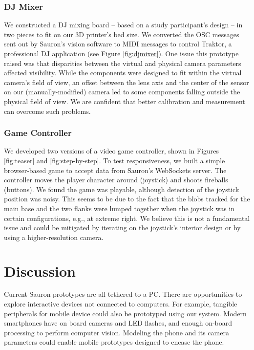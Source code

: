 \subsubsection{DJ Mixer}
We constructed a DJ mixing board -- based on a study participant's design -- in two pieces to fit on our 3D printer's bed size.  We converted the OSC messages sent out by Sauron's vision software to MIDI messages to control Traktor, a professional DJ application (see Figure \ref{fig:djmixer}).  One issue this prototype raised was that disparities between the virtual and physical camera parameters affected visibility. While the components were designed to fit within the virtual camera's field of view, an offset between the lens axis and the center of the sensor on our (manually-modified) camera led to some components falling outside the physical field of view. We are confident that better calibration and measurement can overcome such problems.

\subsubsection{Game Controller}
We developed two versions of a video game controller, shown in Figures \ref{fig:teaser} and \ref{fig:step-by-step}.  To test responsiveness, we built a simple browser-based game to accept data from Sauron's WebSockets server.  The controller moves the player character around (joystick) and shoots fireballs (buttons).  We found the game was playable, although detection of the joystick position was noisy.  This seems to be due to the fact that the blobs tracked for the main base and the two flanks were lumped together when the joystick was in certain configurations, e.g., at extreme right.  We believe this is not a fundamental issue and could be mitigated by iterating on the joystick's interior design or by using a higher-resolution camera.

\section{Discussion}

Current Sauron prototypes are all tethered to a PC. There are opportunities to explore interactive devices not connected to computers.  For example, tangible peripherals for mobile device could also be prototyped using our system.  Modern smartphones have on board cameras and LED flashes, and enough on-board processing to perform computer vision. Modeling the phone and its camera parameters could enable mobile prototypes designed to encase the phone.

